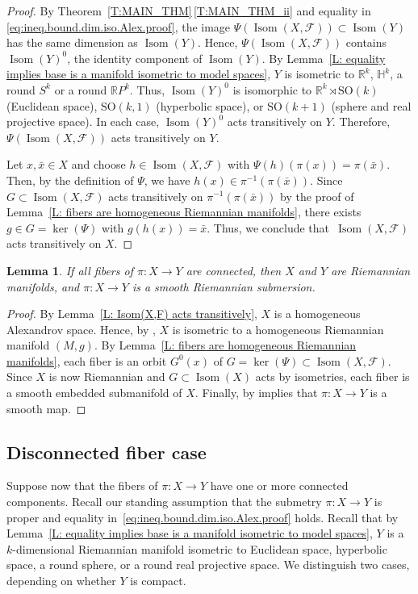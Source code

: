 \documentclass[pdftex]{sigma}
\numberwithin{equation}{section}
\newtheorem{lem}[thm]{Lemma}
\theoremstyle{definition}
\DeclareMathOperator{\Iso}{Isom}
\newcommand{\R}{\mathbb{R}} %
\newcommand{\RP}{\mathbb{R}P} %
\newcommand{\fol}{\mathcal{F}}
\begin{document}
\begin{proof}
By Theorem~\ref{T:MAIN_THM}\,\ref{T:MAIN_THM_ii} and equality in
\eqref{eq:ineq.bound.dim.iso.Alex.proof}, the image $\Psi(\Iso(X,\fol))\subset \Iso(Y)$ has the same dimension as $\Iso(Y)$.
Hence, $\Psi(\Iso(X,\fol))$ contains $\Iso(Y)^0$, the identity component of $\Iso(Y)$.
By Lemma~\ref{L: equality implies base is a manifold isometric to model spaces}, $Y$ is isometric to $\mathbb{R}^k$, $\mathbb{H}^k$, a round $S^k$ or a round $\RP^k$.
Thus, $\Iso(Y)^0$ is isomorphic to $\R^k\rtimes \mathrm{SO}(k)$ (Euclidean space), $\mathrm{SO}(k,1)$ (hyperbolic space), or ${\mathrm{SO}(k+1)}$ (sphere and real projective space).
In each case, $\Iso(Y)^0$ acts transitively on $Y$.
Therefore, $\Psi(\Iso(X,\fol))$ acts transitively on $Y$.


Let $x,\bar{x}\in X$ and choose $h\in \Iso(X,\fol)$ with
$\Psi(h)(\pi(x))=\pi(\bar{x})$.
Then, by the definition of $\Psi$, we have $h(x)\in\pi^{-1}(\pi(\bar{x}))$.
Since $G\subset \Iso(X,\fol)$ acts transitively on $\pi^{-1}(\pi(\bar{x}))$ by the proof of Lemma~\ref{L: fibers are homogeneous Riemannian manifolds}, there exists $g\in G=\ker(\Psi)$ with $g(h(x))=\bar{x}$.
Thus, we conclude that~$\Iso(X,\fol)$ acts transitively on $X$.
\end{proof}

\begin{lem}
\label{L:connected.case.submetry.is.a.riemannian.submersion}
If all fibers of $\pi\colon X\to Y$ are connected, then $X$ and $Y$ are Riemannian manifolds, and $\pi\colon X\to Y$ is a smooth Riemannian submersion.
\end{lem}

\begin{proof}
By Lemma~\ref{L: Isom(X,F) acts transitively}, $X$ is a homogeneous Alexandrov space. Hence, by \cite[Theorem 7]{Berestovskii1989}, $X$ is isometric to a homogeneous Riemannian manifold $(M,g)$.
By Lemma~\ref{L: fibers are homogeneous Riemannian manifolds}, each fiber is an orbit $G^0(x)$ of $G=\ker(\Psi)\subset \Iso(X,\fol)$.
Since $X$ is now Riemannian and $G\subset \Iso(X)$ acts by isometries, each fiber is a smooth embedded submanifold of $X$.
Finally, by \cite[Lemma 13.1]{LytchakWilking2024} implies that $\pi\colon X\to Y$ is a smooth map.
\end{proof}


\subsection{Disconnected fiber case} Suppose now that the fibers of $\pi\colon X\to Y$ have one or more connected components.
Recall our standing assumption that the submetry $\pi\colon X\to Y$ is proper and equality in~\eqref{eq:ineq.bound.dim.iso.Alex.proof} holds. Recall that by Lemma~\ref{L: equality implies base is a manifold isometric to model spaces}, $Y$ is a $k$-dimensional Riemannian manifold isometric to Euclidean space, hyperbolic space, a round sphere, or a round real projective space. We distinguish two cases, depending on whether $Y$ is compact.
\end{document}

